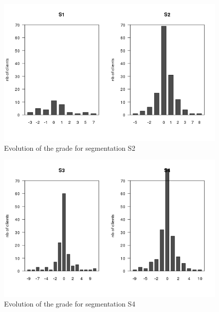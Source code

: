 \documentclass[a4paper, 11pt]{article}
\begin{document}
        \begin{figure}[!ht]
                \centering
                \includegraphics[height = 10 cm]{Remi/Evolution_of_the_grade_for_segmentation_S2.png}
                \caption{Evolution of the grade for segmentation S2}
                \label{fig:e_seg_S2}
        \end{figure}

        \begin{figure}[!ht]
                \centering
                \includegraphics[height = 10 cm]{Remi/Evolution_of_the_grade_for_segmentation_S4.png}
                \caption{Evolution of the grade for segmentation S4}
                \label{fig:e_seg_S4}
        \end{figure}
\end{document}
